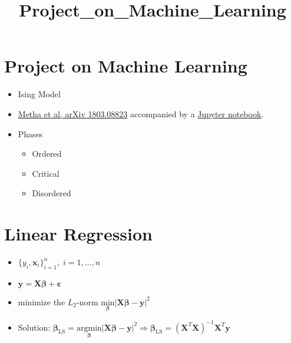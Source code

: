 \documentclass[11pt]{article}
\title{Project\_on\_Machine\_Learning}
\begin{document}
    
    
    \maketitle
    
    

    
    \hypertarget{project-on-machine-learning}{%
\section{Project on Machine
Learning}\label{project-on-machine-learning}}

\begin{itemize}
    \item Ising Model
    \item \href{https://arxiv.org/pdf/1803.08823.pdf}{Metha et al, arXiv
        1803.08823} accompanied by a
        \href{https://physics.bu.edu/~pankajm/MLnotebooks.html}{Jupyter
        notebook}.
    \item Phases
        \begin{itemize}
            \item Ordered
            \item Critical
            \item Disordered
        \end{itemize}
\end{itemize}

\newpage
\hypertarget{linear-regression}{%
\section{Linear Regression}\label{linear-regression}}

\begin{itemize}
    \item $\{y_i, \boldsymbol{x}_i\}_{i=1}^n,\; i=1,\dots,n$
    \item $\boldsymbol{y} = \boldsymbol{X}\boldsymbol{\beta} + \boldsymbol{\varepsilon}$
    \item minimize the \(L_2\)-norm $\underset{\boldsymbol{\beta}}{\text{min}}{\big|}\boldsymbol{X}\boldsymbol{\beta} - \boldsymbol{y}{\big|}^2$
    \item Solution: $\boldsymbol{\beta}_{\text{LS}} = \underset{\boldsymbol{\beta}}{\text{arg}\text{min}}{\big|}\boldsymbol{X}\boldsymbol{\beta} - \boldsymbol{y}{\big|}^2 \Rightarrow \boldsymbol{\beta}_{\text{LS}} = \left(\boldsymbol{X}^T\boldsymbol{X}\right)^{-1}\boldsymbol{X}^T\boldsymbol{y}$
\end{itemize}
\end{document}
